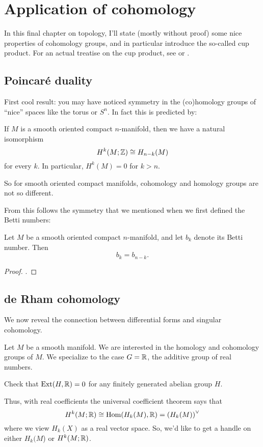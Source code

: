 \chapter{Application of cohomology}
In this final chapter on topology, I'll state (mostly without proof)
some nice properties of cohomology groups, and in particular
introduce the so-called cup product.
For an actual treatise on the cup product,
see \cite{ref:hatcher} or \cite{ref:maxim752}.

\section{Poincar\'e duality}
First cool result:
you may have noticed symmetry in the (co)homology groups of
``nice'' spaces like the torus or $S^n$.
In fact this is predicted by:
\begin{theorem}
	If $M$ is a smooth oriented compact $n$-manifold,
	then we have a natural isomorphism
	\[ H^k(M; \mathbb Z) \cong H_{n-k}(M) \]
	for every $k$.
	In particular, $H^k(M) = 0$ for $k > n$.
\end{theorem}
So for smooth oriented compact manifolds,
cohomology and homology groups are not so different.

From this follows the symmetry that we mentioned
when we first defined the Betti numbers:
\begin{corollary}
	Let $M$ be a smooth oriented compact $n$-manifold,
	and let $b_k$ denote its Betti number.
	Then \[ b_k = b_{n-k}. \]
\end{corollary}
\begin{proof}
	.
\end{proof}


\section{de Rham cohomology}
We now reveal the connection between
differential forms and singular cohomology.

Let $M$ be a smooth manifold.
We are interested in the homology and cohomology groups of $M$.
We specialize to the case $G = \mathbb R$, the additive group of real numbers.
\begin{ques}
	Check that $\operatorname{Ext}(H, \mathbb R) = 0$ for any finitely generated abelian group $H$.
\end{ques}
Thus, with real coefficients the universal coefficient theorem says that
\[ H^k(M; \mathbb R) \cong \operatorname{Hom}(H_k(M), \mathbb R) = \left( H_k(M) \right)^\vee \]
where we view $H_k(X)$ as a real vector space.
So, we'd like to get a handle on either $H_k(M$) or $H^k(M; \mathbb R)$.

